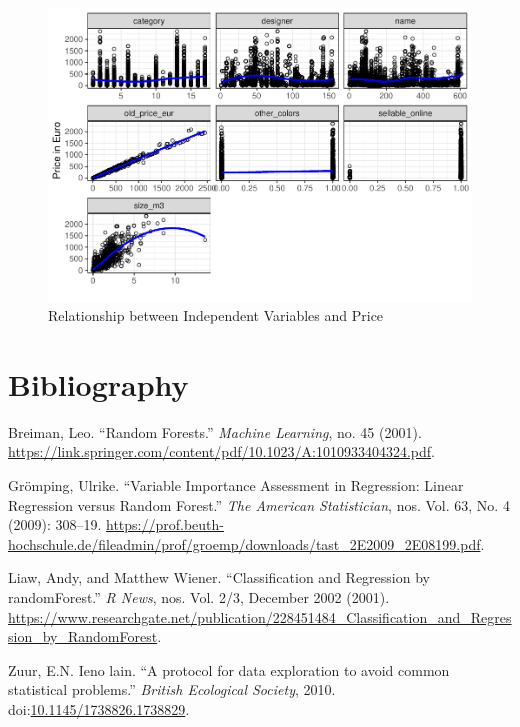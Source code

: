 \documentclass[a4paper, nobind]{templates/ociamthesis}
\newcommand*{\bibtitle}{Works Cited}
\begin{document}
\begin{figure}[!h]
\includegraphics[width=1\linewidth]{_main_files/figure-latex/relationship-x-y-1} \caption{Relationship between Independent Variables and Price}\label{fig:relationship-x-y}
\end{figure}

\hypertarget{bibliography}{%
\chapter{Bibliography}\label{bibliography}}

\hypertarget{refs}{}
\leavevmode\hypertarget{ref-Breiman2001}{}%
Breiman, Leo. ``Random Forests.'' \emph{Machine Learning}, no. 45 (2001). \url{https://link.springer.com/content/pdf/10.1023/A:1010933404324.pdf}.

\leavevmode\hypertarget{ref-Groemping2009}{}%
Grömping, Ulrike. ``Variable Importance Assessment in Regression: Linear Regression versus Random Forest.'' \emph{The American Statistician}, nos. Vol. 63, No. 4 (2009): 308--19. \url{https://prof.beuth-hochschule.de/fileadmin/prof/groemp/downloads/tast_2E2009_2E08199.pdf}.

\leavevmode\hypertarget{ref-Liaw2002}{}%
Liaw, Andy, and Matthew Wiener. ``Classification and Regression by randomForest.'' \emph{R News}, nos. Vol. 2/3, December 2002 (2001). \url{https://www.researchgate.net/publication/228451484_Classification_and_Regression_by_RandomForest}.

\leavevmode\hypertarget{ref-Zuur2010}{}%
Zuur, E.N. Ieno lain. ``A protocol for data exploration to avoid common statistical problems.'' \emph{British Ecological Society}, 2010. doi:\href{https://doi.org/10.1145/1738826.1738829}{10.1145/1738826.1738829}.




\setlength{\baselineskip}{0pt} %

{\renewcommand*\MakeUppercase[1]{#1}%
\printbibliography[heading=bibintoc,title={\bibtitle}]}
\end{document}
